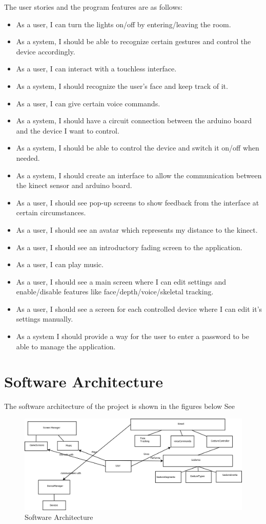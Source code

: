 The user stories and the program features are as follows:
\begin{itemize}
\item As a user, I can turn the lights on/off by entering/leaving the room.
\item As a system, I should be able to recognize certain gestures and control the device accordingly.
\item As a user, I can interact with a touchless interface.
\item As a system, I should recognize the user's face and keep track of it.
\item As a user, I can give certain voice commands.
\item As a system, I should have a circuit connection between the arduino board and the device I want to control.
\item As a system, I should be able to control the device and switch it on/off when needed.
\item As a system, I should create an interface to allow the communication between the kinect sensor and arduino board.
\item As  a user, I should see pop-up screens to show feedback from the interface at certain circumstances.
\item As a user, I should see an avatar which represents my distance to the kinect.
\item As a user, I should see an introductory fading screen to the application.
\item As a user, I can play music.
\item As a user, I should see a main screen where I can edit settings and enable/disable features like face/depth/voice/skeletal tracking.
\item As a user, I should see a screen for each controlled device where I can edit it's settings manually.
\item As a system I should provide a way for the user to enter a password to be able to manage the application.
\end{itemize}

\section{Software Architecture}

The software architecture of the project is shown in the figures below
See 
\begin{figure}[bp]
  \centering
  \includegraphics[width=1\linewidth]{SoftwareArchitecture}
  \caption{Software Architecture}
  \label{fig:softwarearchitecture}
\end{figure}

